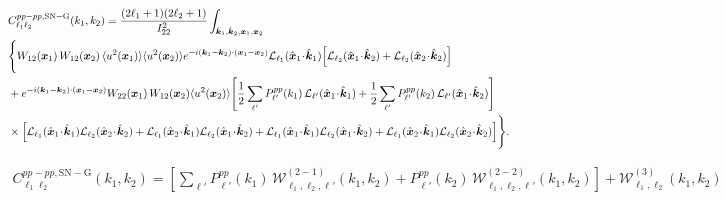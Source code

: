 \documentclass[a4paper,11pt]{article}
\begin{document}
\begin{align}
&C^{pp-pp, \mathrm{SN-G}}_{\ell_1 \ell_2}(k_1,k_2)
=
\frac{(2\ell_1+1)(2\ell_2+1)}{I_{22}^2}
\int_{\hat{\boldsymbol{k}}_1,\hat{\boldsymbol{k}}_2,\boldsymbol{x}_1,\boldsymbol{x}_2} \nonumber\\
&
\Biggl\{
W_{12}(\boldsymbol{x}_1)\,
W_{12}(\boldsymbol{x}_2)\,
\langle u^2(\boldsymbol{x}_1)\rangle
\langle u^2(\boldsymbol{x}_2)\rangle
e^{-i(\boldsymbol{k}_1-\boldsymbol{k}_2)\cdot(\boldsymbol{x}_1-\boldsymbol{x}_2)}
\mathcal{L}_{\ell_1}(\hat{\boldsymbol{x}}_1\!\cdot\!\hat{\boldsymbol{k}}_1)
\Bigl[
\mathcal{L}_{\ell_2}(\hat{\boldsymbol{x}}_1\!\cdot\!\hat{\boldsymbol{k}}_2)
+
\mathcal{L}_{\ell_2}(\hat{\boldsymbol{x}}_2\!\cdot\!\hat{\boldsymbol{k}}_2)
\Bigr]
\nonumber\\
&
+
e^{-i(\boldsymbol{k}_1-\boldsymbol{k}_2)\cdot(\boldsymbol{x}_1-\boldsymbol{x}_2)}
W_{22}(\boldsymbol{x}_1)\,
W_{12}(\boldsymbol{x}_2)
\langle u^2(\boldsymbol{x}_2)\rangle
\Biggl[
\frac{1}{2}\sum_{\ell'}
P^{pp}_{\ell'}(k_1)\,
\mathcal{L}_{\ell'}(\hat{\boldsymbol{x}}_1\!\cdot\!\hat{\boldsymbol{k}}_1)
+
\frac{1}{2}\sum_{\ell'}
P^{pp}_{\ell'}(k_2)\,
\mathcal{L}_{\ell'}(\hat{\boldsymbol{x}}_1\!\cdot\!\hat{\boldsymbol{k}}_2)
\Biggr]
\nonumber\\
&\times
\Bigl[
\mathcal{L}_{\ell_1}(\hat{\boldsymbol{x}}_1\!\cdot\!\hat{\boldsymbol{k}}_1)
\mathcal{L}_{\ell_2}(\hat{\boldsymbol{x}}_2\!\cdot\!\hat{\boldsymbol{k}}_2)
+
\mathcal{L}_{\ell_1}(\hat{\boldsymbol{x}}_2\!\cdot\!\hat{\boldsymbol{k}}_1)
\mathcal{L}_{\ell_2}(\hat{\boldsymbol{x}}_1\!\cdot\!\hat{\boldsymbol{k}}_2)
+
\mathcal{L}_{\ell_1}(\hat{\boldsymbol{x}}_1\!\cdot\!\hat{\boldsymbol{k}}_1)
\mathcal{L}_{\ell_2}(\hat{\boldsymbol{x}}_1\!\cdot\!\hat{\boldsymbol{k}}_2)
+
\mathcal{L}_{\ell_1}(\hat{\boldsymbol{x}}_2\!\cdot\!\hat{\boldsymbol{k}}_1)
\mathcal{L}_{\ell_2}(\hat{\boldsymbol{x}}_2\!\cdot\!\hat{\boldsymbol{k}}_2)
\Bigr]
\Biggr\}.
\end{align}

\begin{align}
 C^{pp-pp, \mathrm{SN-G}}_{\ell_1 \ell_2}(k_1,k_2)
=
\left[
\sum_{\ell'}
P^{pp}_{\ell'}(k_1)\,
\mathcal{W}^{(2-1)}_{\ell_1,\ell_2,\ell'}(k_1,k_2)
+
P^{pp}_{\ell'}(k_2)\,
\mathcal{W}^{(2-2)}_{\ell_1,\ell_2,\ell'}(k_1,k_2)
\right]
+
\mathcal{W}^{(3)}_{\ell_1,\ell_2}(k_1,k_2)
\end{align}
\end{document}
